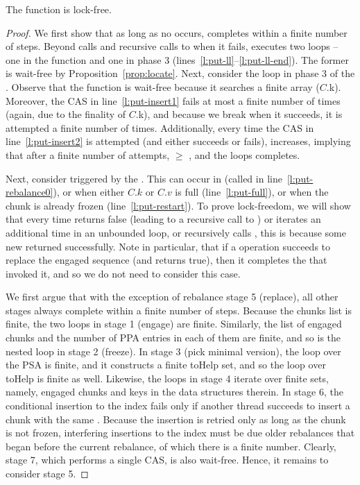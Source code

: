 \begin{lemma}
The   function is lock-free.
\end{lemma}
\begin{proof}
We first show that as long as no  occurs,  completes within a finite number of steps. 
Beyond  calls and recursive calls to  when it fails,  executes 
two loops --  one in the  function and one 
in phase 3 (lines~\ref{l:put-ll}--\ref{l:put-ll-end}).  
The former is wait-free by  Proposition~\ref{prop:locate}. 
Next, consider the loop in phase 3 of the . 
Observe that the  function is wait-free because it searches a finite array ($C$.k).
Moreover, the CAS in line~\ref{l:put-insert1} fails at most a finite number of times (again, due to the finality of  $C$.k),
and because we break when it succeeds, it is attempted a finite number of times. 
Additionally, every time the CAS in line~\ref{l:put-insert2} is attempted (and either succeeds or fails),    increases,
implying that after a finite number of attempts, { $ \geq$ }, and the loops completes. 

Next, consider  triggered by the . This can occur in  (called in line~\ref{l:put-rebalance0}), 
or when either $C.k$ or $C.v$ is full (line~\ref{l:put-full}), or when the chunk is already frozen (line~\ref{l:put-restart}). 
To prove lock-freedom, 
we will show that every time  returns false (leading to a recursive call to ) or iterates  
an additional time in an unbounded loop, or recursively calls , this is because some new   returned successfully. 
Note in particular, that if a   operation succeeds to replace the engaged sequence (and returns true), then it 
completes the  that invoked it, and so we do not need to consider this case.

We first argue that with the exception of rebalance stage 5 (replace), all other   stages  always complete within a finite number of steps. 
Because the chunks list is finite, the two loops in stage 1 (engage) are finite. 
Similarly, the list of engaged chunks and the number of PPA entries in each of them are finite, and so is the nested loop in stage 2 (freeze). 
In stage 3 (pick minimal version), the loop over the PSA is finite, and it constructs a finite toHelp set, and so the loop over toHelp is finite as well.
Likewise, the loops in stage 4 iterate over finite sets, namely, engaged chunks and keys in the data structures therein.  
In stage 6, the conditional insertion to the index fails only if another thread succeeds to insert a chunk with the same . 
Because the insertion is retried only as long as the chunk is not frozen, interfering insertions to the index must be due older rebalances that began before 
the current rebalance, of which there is  a finite number.
Clearly, stage 7, which performs a single CAS, is also wait-free. 
Hence, it remains to consider stage 5.   


\end{proof}
